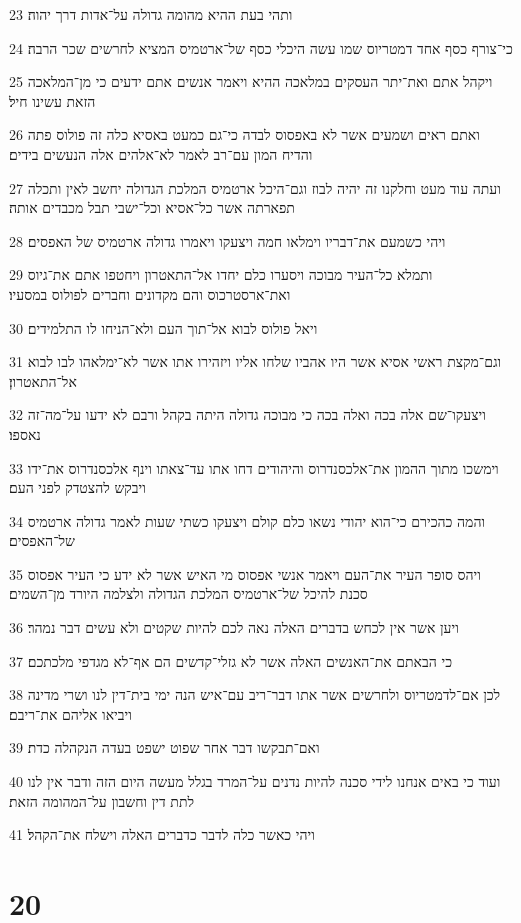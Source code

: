 \par 23 ותהי בעת ההיא מהומה גדולה על־אדות דרך יהוה׃
\par 24 כי־צורף כסף אחד דמטריוס שמו עשה היכלי כסף של־ארטמיס המציא לחרשים שכר הרבה׃
\par 25 ויקהל אתם ואת־יתר העסקים במלאכה ההיא ויאמר אנשים אתם ידעים כי מן־המלאכה הזאת עשינו חיל׃
\par 26 ואתם ראים ושמעים אשר לא באפסוס לבדה כי־גם כמעט באסיא כלה זה פולוס פתה והדיח המון עם־רב לאמר לא־אלהים אלה הנעשים בידים׃
\par 27 ועתה עוד מעט וחלקנו זה יהיה לבוז וגם־היכל ארטמיס המלכת הגדולה יחשב לאין ותכלה תפארתה אשר כל־אסיא וכל־ישבי תבל מכבדים אותה׃
\par 28 ויהי כשמעם את־דבריו וימלאו חמה ויצעקו ויאמרו גדולה ארטמיס של האפסים׃
\par 29 ותמלא כל־העיר מבוכה ויסערו כלם יחדו אל־התאטרון ויחטפו אתם את־גיוס ואת־ארסטרכוס והם מקדונים וחברים לפולוס במסעיו׃
\par 30 ויאל פולוס לבוא אל־תוך העם ולא־הניחו לו התלמידים׃
\par 31 וגם־מקצת ראשי אסיא אשר היו אהביו שלחו אליו ויזהירו אתו אשר לא־ימלאהו לבו לבוא אל־התאטרון׃
\par 32 ויצעקו־שם אלה בכה ואלה בכה כי מבוכה גדולה היתה בקהל ורבם לא ידעו על־מה־זה נאספו׃
\par 33 וימשכו מתוך ההמון את־אלכסנדרוס והיהודים דחו אתו עד־צאתו וינף אלכסנדרוס את־ידו ויבקש להצטדק לפני העם׃
\par 34 והמה כהכירם כי־הוא יהודי נשאו כלם קולם ויצעקו כשתי שעות לאמר גדולה ארטמיס של־האפסים׃
\par 35 ויהס סופר העיר את־העם ויאמר אנשי אפסוס מי האיש אשר לא ידע כי העיר אפסוס סכנת להיכל של־ארטמיס המלכת הגדולה ולצלמה היורד מן־השמים׃
\par 36 ויען אשר אין לכחש בדברים האלה נאה לכם להיות שקטים ולא עשים דבר נמהר׃
\par 37 כי הבאתם את־האנשים האלה אשר לא גזלי־קדשים הם אף־לא מגדפי מלכתכם׃
\par 38 לכן אם־לדמטריוס ולחרשים אשר אתו דבר־ריב עם־איש הנה ימי בית־דין לנו ושרי מדינה ויביאו אליהם את־ריבם׃
\par 39 ואם־תבקשו דבר אחר שפוט ישפט בעדה הנקהלה כדת׃
\par 40 ועוד כי באים אנחנו לידי סכנה להיות נדנים על־המרד בגלל מעשה היום הזה ודבר אין לנו לתת דין וחשבון על־המהומה הזאת׃
\par 41 ויהי כאשר כלה לדבר כדברים האלה וישלח את־הקהל׃

\chapter{20}

